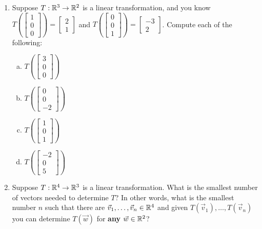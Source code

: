 \documentclass{article}
\begin{document}
\begin{app}
\begin{enumerate}[1)]
\item Suppose $T: \mathbb{R}^3 \rightarrow \mathbb{R}^2$ is a linear transformation, and you know $T\left(\begin{bmatrix} 1 \\ 0 \\ 0 \end{bmatrix} \right) = \begin{bmatrix} 2 \\ 1 \end{bmatrix} $ and $T\left(\begin{bmatrix} 0 \\ 0 \\ 1 \end{bmatrix} \right) = \begin{bmatrix} -3 \\ 2 \end{bmatrix} $.  Compute each of the following:
\begin{enumerate}[(a)]
\item $T\left(\begin{bmatrix} 3 \\ 0 \\ 0 \end{bmatrix}\right)$
\item $T\left(\begin{bmatrix} 0 \\ 0 \\ -2 \end{bmatrix}\right)$
\item $T\left(\begin{bmatrix} 1 \\ 0 \\ 1 \end{bmatrix}\right)$
\item $T\left(\begin{bmatrix} -2 \\ 0 \\ 5 \end{bmatrix}\right)$
\end{enumerate}

\item Suppose $T: \mathbb{R}^4 \rightarrow \mathbb{R}^3$ is a linear transformation.  What is the smallest number of vectors needed to determine $T$?  In other words, what is the smallest number $n$ such that there are $\vec{v}_1,\ldots,\vec{v}_n \in \mathbb{R}^4$ and given  $T(\vec{v}_1), \ldots, T(\vec{v}_n)$ you can determine $T(\vec{w})$ for {\bf any} $\vec{w} \in \mathbb{R}^2$?
\end{enumerate}


\end{app}
\end{document}
